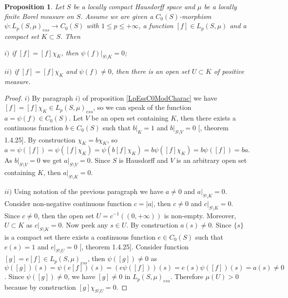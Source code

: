 \documentclass[12pt]{article}
\newtheorem{proposition}[theorem]{Proposition}
\begin{document}
\begin{proposition}\label{MorphLpEssC0Prop} Let $S$ be a locally compact Hausdorff space and $\mu$ be a locally finite Borel measure on $S$. Assume we are given a $C_0(S)$-morphism $\psi:L_p(S,\mu)_{ess}\to C_0(S)$ with $1\leq p\leq+\infty$, a function $[f]\in L_p(S,\mu)$ and a compact set $K\subset S$. Then

    $i)$ if $[f]=[f]\chi_K$, then $\psi(f)|_{S\setminus K}=0$;

    $ii)$ if $[f]=[f]\chi_K$ and $\psi(f)\neq 0$, then there is an open set $U\subset K$ of positive measure.
\end{proposition}
\begin{proof} $i)$ By paragraph $i)$ of proposition \ref{LpEssC0ModCharac} we have $[f]=[f]\chi_K\in L_p(S,\mu)_{ess}$, so we can speak of the function $a=\psi(f)\in C_0(S)$. Let $V$ be an open set containing $K$, then there exists a continuous function $b\in C_0(S)$ such that $b|_K=1$ and $b|_{S\setminus V}=0$ [\cite{DalesBanSpContFunDualSp}, theorem 1.4.25]. By construction $\chi_K=b\chi_K$, so $a=\psi([f])=\psi([f]\chi_K)=\psi(b[f]\chi_K)=b\psi([f]\chi_K)=b\psi([f])=ba$. As $b|_{S\setminus V}=0$ we get $a|_{S\setminus V}=0$. Since $S$ is Hausdorff and $V$ is an arbitrary open set containing $K$, then $a|_{S\setminus K}=0$.

    $ii)$ Using notation of the previous paragraph we have $a\neq 0$ and $a|_{S\setminus K}=0$. Consider non-negative continuous function $c=|a|$, then $c\neq 0$ and $c|_{S\setminus K}=0$. Since $c\neq 0$, then the open set $U=c^{-1}((0, +\infty))$ is non-empty. Moreover, $U\subset K$ as $c|_{S\setminus K}=0$. Now peek any $s\in U$. By construction $a(s)\neq 0$. Since $\{s\}$ is a compact set there exists a continuous function $e\in C_0(S)$ such that $e(s)=1$ and $e|_{S\setminus U}=0$ [\cite{DalesBanSpContFunDualSp}, theorem 1.4.25]. Consider function $[g]=e[f]\in L_p(S,\mu)_{ess}$, then $\psi([g])\neq 0$ as $\psi([g])(s)=\psi(e[f])(s)=(e\psi([f]))(s)=e(s)\psi([f])(s)=a(s)\neq 0$. Since $\psi([g])\neq 0$, we have $[g]\neq 0$ in $L_p(S,\mu)_{ess}$. Therefore $\mu(U)>0$ because by construction $[g]\chi_{S\setminus U}=0$.
\end{proof}
\end{document}
